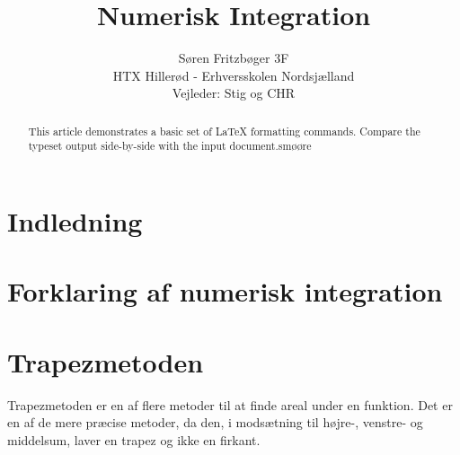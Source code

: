 \documentclass[12pt]{article}
\numberwithin{equation}{section}
\begin{document}
\title{Numerisk Integration}
\author{Søren Fritzbøger 3F\\
HTX Hillerød - Erhversskolen Nordsjælland\\
Vejleder: Stig og CHR}
\renewcommand{\today}{2. Februar 2015}
\maketitle

\begin{abstract}
This article demonstrates a basic set of LaTeX formatting commands.
Compare the typeset output side-by-side with the input document.smøøre
\end{abstract}

\tableofcontents

\section{Indledning}

\section{Forklaring af numerisk integration}



\section{Trapezmetoden}
\label{sec:trapezmetoden}
Trapezmetoden er en af flere metoder til at finde areal under en funktion. Det er en af de mere præcise metoder, da den, i modsætning til højre-, venstre- og middelsum, laver en trapez og ikke en firkant.
\end{document}
